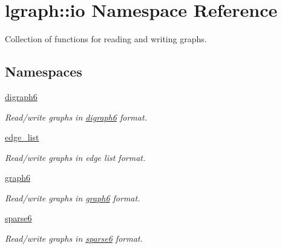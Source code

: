 \hypertarget{namespacelgraph_1_1io}{}\section{lgraph\+:\+:io Namespace Reference}
\label{namespacelgraph_1_1io}


Collection of functions for reading and writing graphs.  


\subsection*{Namespaces}
\begin{DoxyCompactItemize}
\item 
 \hyperlink{namespacelgraph_1_1io_1_1digraph6}{digraph6}
\begin{DoxyCompactList}\small\item\em Read/write graphs in {\itshape \hyperlink{namespacelgraph_1_1io_1_1digraph6}{digraph6}} format. \end{DoxyCompactList}\item 
 \hyperlink{namespacelgraph_1_1io_1_1edge__list}{edge\+\_\+list}
\begin{DoxyCompactList}\small\item\em Read/write graphs in {\itshape edge} {\itshape list} format. \end{DoxyCompactList}\item 
 \hyperlink{namespacelgraph_1_1io_1_1graph6}{graph6}
\begin{DoxyCompactList}\small\item\em Read/write graphs in {\itshape \hyperlink{namespacelgraph_1_1io_1_1graph6}{graph6}} format. \end{DoxyCompactList}\item 
 \hyperlink{namespacelgraph_1_1io_1_1sparse6}{sparse6}
\begin{DoxyCompactList}\small\item\em Read/write graphs in {\itshape \hyperlink{namespacelgraph_1_1io_1_1sparse6}{sparse6}} format. \end{DoxyCompactList}\end{DoxyCompactItemize}
